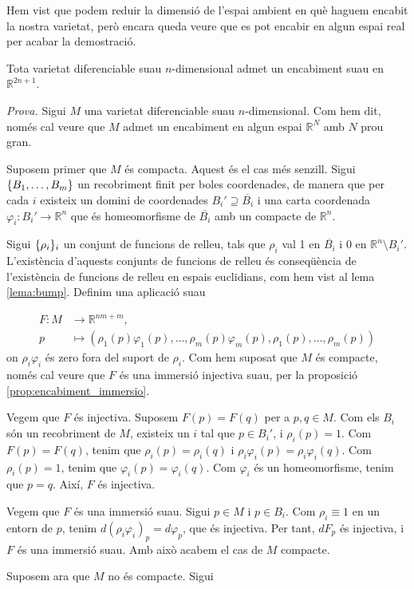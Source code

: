 Hem vist que podem reduir la dimensió de l'espai ambient en què haguem encabit la nostra varietat, però encara queda veure que es pot encabir en algun espai real per acabar la demostració.

\begin{teo}
    Tota varietat diferenciable suau $n$-dimensional admet un encabiment suau en $\mathbb R^{2n+1}$.
\end{teo}
{
    \color{green!50!black} \textit{Prova.}
    Sigui $M$ una varietat diferenciable suau $n$-dimensional. Com hem dit, només cal veure que $M$ admet un encabiment en algun espai $\mathbb R^N$ amb $N$ prou gran.

    Suposem primer que $M$ és compacta. Aquest és el cas més senzill. Sigui $\{B_1,\dots,B_m\}$ un recobriment finit per boles coordenades, de manera que per cada $i$ existeix un domini de coordenades $B_i'\supseteq \overline{B_i}$ i una carta coordenada $\varphi_i:B_i'\to\mathbb R^n$ que és homeomorfisme de $\overline{B_i}$ amb un compacte de $\mathbb R^n$.

    Sigui $\{\rho_i\}_i$ un conjunt de funcions de relleu, tals que $\rho_i$ val 1 en $\overline{B_i}$ i 0 en $\mathbb R^n\setminus B_i'$. L'existència d'aquests conjunts de funcions de relleu és conseqüència de l'existència de funcions de relleu en espais euclidians, com hem vist al lema \ref{lema:bump}. Definim una aplicació suau

    \begin{align*}
        F:M&\to\mathbb R^{nm + m},\\
        p&\mapsto \left(\rho_1(p)\varphi_1(p),\dots,\rho_m(p)\varphi_m(p), \rho_1(p),\dots,\rho_m(p)\right)
    \end{align*}
    on $\rho_i\varphi_i$ és zero fora del suport de $\rho_i$. Com hem suposat que $M$ és compacte, només cal veure que $F$ és una immersió injectiva suau, per la proposició \ref{prop:encabiment_immersio}.

    Vegem que $F$ és injectiva. Suposem $F(p) = F(q)$ per a $p,q\in M$. Com els $B_i$ són un recobriment de $M$, existeix un $i$ tal que $p\in B_i'$, i $\rho_i(p)=1$. Com $F(p) = F(q)$, tenim que $\rho_i(p) = \rho_i(q)$ i $\rho_i\varphi_i(p) = \rho_i\varphi_i(q)$. Com $\rho_i(p)=1$, tenim que $\varphi_i(p) = \varphi_i(q)$. Com $\varphi_i$ és un homeomorfisme, tenim que $p=q$. Així, $F$ és injectiva.

    Vegem que $F$ és una immersió suau. Sigui $p\in M$ i $p\in B_i$. Com $\rho_i\equiv1$ en un entorn de $p$, tenim $d(\rho_i\varphi_i)_p = d\varphi_p$, que és injectiva. Per tant, $dF_p$ és injectiva, i $F$ és una immersió suau.
    Amb això acabem el cas de $M$ compacte.

    Suposem ara que $M$ no és compacte. Sigui 

    

}





